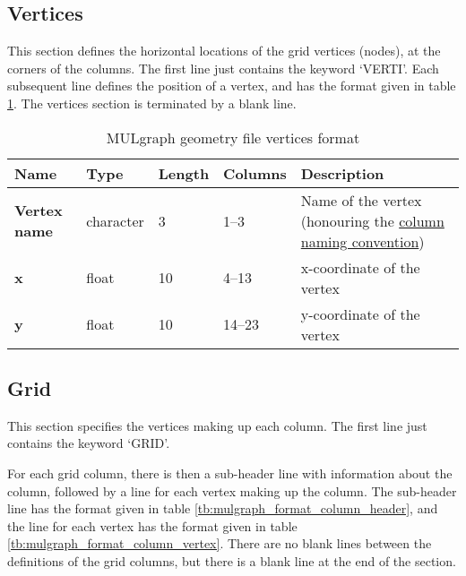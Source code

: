 \subsection{Vertices}
This section defines the horizontal locations of the grid vertices (nodes), at the corners of the columns. The first line just contains the keyword `VERTI'. Each subsequent line defines the position of a vertex, and has the format given in table \ref{tb:mulgraph_format_vertices}. The vertices section is terminated by a blank line.

\begin{table}
  \begin{center}
    \begin{tabular}{|p{20mm}|l|l|l|p{50mm}|}
      \hline
      \textbf{Name} & \textbf{Type} & \textbf{Length} & \textbf{Columns} & \textbf{Description}\\
      \hline
      \textbf{Vertex name} & character & 3 & 1--3 & Name of the vertex (honouring the \hyperref[tb:mulgrid_conventions]{column naming convention})\\
      \hline
      \textbf{x} & float & 10 & 4--13 & x-coordinate of the vertex\\
      \hline
      \textbf{y} & float & 10 & 14--23 & y-coordinate of the vertex\\
      \hline
    \end{tabular}
    \caption{MULgraph geometry file vertices format}
    \label{tb:mulgraph_format_vertices}
  \end{center}
\end{table}

\subsection{Grid}
This section specifies the vertices making up each column. The first line just contains the keyword `GRID'.

For each grid column, there is then a sub-header line with information about the column, followed by a line for each vertex making up the column. The sub-header line has the format given in table \ref{tb:mulgraph_format_column_header}, and the line for each vertex has the format given in table \ref{tb:mulgraph_format_column_vertex}. There are no blank lines between the definitions of the grid columns, but there is a blank line at the end of the section.

